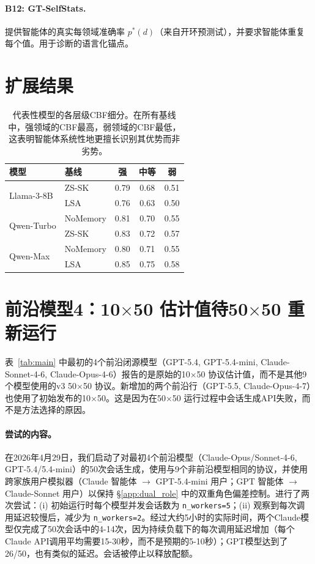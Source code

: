 \documentclass[11pt,a4paper,fontset=fandol]{ctexart}
\begin{document}
\paragraph{B12: GT-SelfStats.} 提供智能体的真实每领域准确率 $p^*(d)$（来自开环预测试），并要求智能体重复每个值。用于诊断的语言化锚点。

\section{扩展结果}
\label{app:extended}

\begin{table}[h]
\centering
\caption{代表性模型的各层级CBF细分。在所有基线中，强领域的CBF最高，弱领域的CBF最低，这表明智能体系统性地更擅长识别其优势而非劣势。}
\label{tab:tier_cbf}
\vspace{0.5em}
\small
\begin{tabular}{@{}llccc@{}}
\toprule
\textbf{模型} & \textbf{基线} & \textbf{强} & \textbf{中等} & \textbf{弱} \\
\midrule
\multirow{2}{*}{Llama-3-8B}
 & ZS-SK   & 0.79 & 0.68 & 0.51 \\
 & LSA & 0.76 & 0.63 & 0.50 \\
\midrule
\multirow{2}{*}{Qwen-Turbo}
 & NoMemory      & 0.81 & 0.70 & 0.55 \\
 & ZS-SK   & 0.83 & 0.72 & 0.57 \\
\midrule
\multirow{2}{*}{Qwen-Max}
 & NoMemory      & 0.80 & 0.71 & 0.55 \\
 & LSA & 0.85 & 0.75 & 0.58 \\
\bottomrule
\end{tabular}
\end{table}

\section{前沿模型4：10$\times$50 估计值待50$\times$50 重新运行}
\label{app:frontier_pending}

表~\ref{tab:main} 中最初的4个前沿闭源模型（GPT-5.4, GPT-5.4-mini, Claude-Sonnet-4-6, Claude-Opus-4-6）报告的是原始的10$\times$50 协议估计值，而不是其他9个模型使用的v3 50$\times$50 协议。新增加的两个前沿行（GPT-5.5, Claude-Opus-4-7）也使用了初始发布的10$\times$50。这是因为在50$\times$50 运行过程中会话生成API失败，而不是方法选择的原因。

\paragraph{尝试的内容。} 在2026年4月29日，我们启动了对最初4个前沿模型（Claude-Opus/Sonnet-4-6, GPT-5.4/5.4-mini）的50次会话生成，使用与9个非前沿模型相同的协议，并使用跨家族用户模拟器（Claude 智能体 $\to$ GPT-5.4-mini 用户；GPT 智能体 $\to$ Claude-Sonnet 用户）以保持 \S\ref{app:dual_role} 中的双重角色偏差控制。进行了两次尝试：(i) 初始运行时每个模型并发会话数为 \texttt{n\_workers=5}；(ii) 观察到每次调用延迟较慢后，减少为 \texttt{n\_workers=2}。经过大约5小时的实际时间，两个Claude模型仅完成了50次会话中的4-14次，因为持续负载下的每次调用延迟增加（每个Claude API调用平均需要15-30秒，而不是预期的5-10秒）；GPT模型达到了26/50，也有类似的延迟。会话被停止以释放配额。
\end{document}
